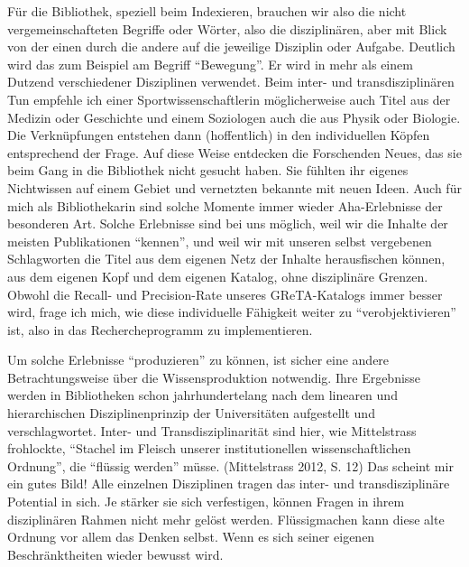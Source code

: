 Für die Bibliothek, speziell beim Indexieren, brauchen wir also die
nicht vergemeinschafteten Begriffe oder Wörter, also die disziplinären,
aber mit Blick von der einen durch die andere auf die jeweilige
Disziplin oder Aufgabe. Deutlich wird das zum Beispiel am Begriff
\enquote{Bewegung}. Er wird in mehr als einem Dutzend verschiedener
Disziplinen verwendet. Beim inter- und transdisziplinären Tun empfehle
ich einer Sportwissenschaftlerin möglicherweise auch Titel aus der
Medizin oder Geschichte und einem Soziologen auch die aus Physik oder
Biologie. Die Verknüpfungen entstehen dann (hoffentlich) in den
individuellen Köpfen entsprechend der Frage. Auf diese Weise entdecken
die Forschenden Neues, das sie beim Gang in die Bibliothek nicht gesucht
haben. Sie fühlten ihr eigenes Nichtwissen auf einem Gebiet und
vernetzten bekannte mit neuen Ideen. Auch für mich als Bibliothekarin
sind solche Momente immer wieder Aha-Erlebnisse der besonderen Art.
Solche Erlebnisse sind bei uns möglich, weil wir die Inhalte der meisten
Publikationen \enquote{kennen}, und weil wir mit unseren selbst
vergebenen Schlagworten die Titel aus dem eigenen Netz der Inhalte
herausfischen können, aus dem eigenen Kopf und dem eigenen Katalog, ohne
disziplinäre Grenzen. Obwohl die Recall- und Precision-Rate unseres
GReTA-Katalogs immer besser wird, frage ich mich, wie diese individuelle
Fähigkeit weiter zu \enquote{verobjektivieren} ist, also in das
Rechercheprogramm zu implementieren.

Um solche Erlebnisse \enquote{produzieren} zu können, ist sicher eine
andere Betrachtungsweise über die Wissensproduktion notwendig. Ihre
Ergebnisse werden in Bibliotheken schon jahrhundertelang nach dem
linearen und hierarchischen Disziplinenprinzip der Universitäten
aufgestellt und verschlagwortet. Inter- und Transdisziplinarität sind
hier, wie Mittelstrass frohlockte, \enquote{Stachel im Fleisch unserer
institutionellen wissenschaftlichen Ordnung}, die \enquote{flüssig
werden} müsse. (Mittelstrass 2012, S. 12) Das scheint mir ein gutes
Bild! Alle einzelnen Disziplinen tragen das inter- und transdisziplinäre
Potential in sich. Je stärker sie sich verfestigen, können Fragen in
ihrem disziplinären Rahmen nicht mehr gelöst werden. Flüssigmachen kann
diese alte Ordnung vor allem das Denken selbst. Wenn es sich seiner
eigenen Beschränktheiten wieder bewusst wird.

